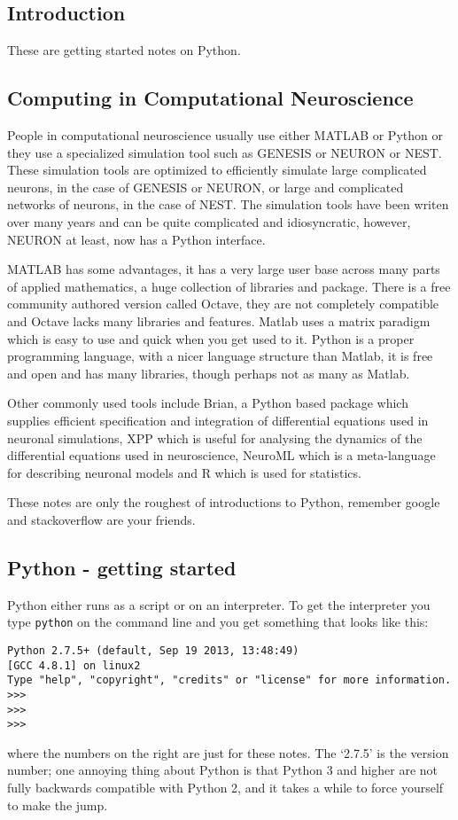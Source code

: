 \documentclass[11pt,a4paper]{scrartcl}
\begin{document}
\subsection*{Introduction}
These are getting started notes on Python.
\subsection*{Computing in Computational Neuroscience}
People in computational neuroscience usually use either MATLAB or
Python or they use a specialized simulation tool such as GENESIS or
NEURON or NEST. These simulation tools are optimized to efficiently
simulate large complicated neurons, in the case of GENESIS or NEURON,
or large and complicated networks of neurons, in the case of NEST. The
simulation tools have been writen over many years and can be quite
complicated and idiosyncratic, however, NEURON at least, now has a
Python interface. 

MATLAB has some advantages, it has a very large user base across many
parts of applied mathematics, a huge collection of libraries and
package. There is a free community authored version called Octave,
they are not completely compatible and Octave lacks many libraries and
features. Matlab uses a matrix paradigm which is easy to use and quick
when you get used to it. Python is a proper programming language, with
a nicer language structure than Matlab, it is free and open and has
many libraries, though perhaps not as many as Matlab.

Other commonly used tools include Brian, a Python based package which
supplies efficient specification and integration of differential
equations used in neuronal simulations, XPP which is useful for
analysing the dynamics of the differential equations used in
neuroscience, NeuroML which is a meta-language for describing neuronal
models and R which is used for statistics.

These notes are only the roughest of introductions to Python, remember
google and stackoverflow are your friends.

\subsection*{Python - getting started}
Python either runs as a script or on an interpreter. To get the
interpreter you type \texttt{python} on the command line and you get
something that looks like this:
\begin{lstlisting}[numbers=right]
Python 2.7.5+ (default, Sep 19 2013, 13:48:49) 
[GCC 4.8.1] on linux2
Type "help", "copyright", "credits" or "license" for more information.
>>> 
>>> 
>>> 
\end{lstlisting}
where the numbers on the right are just for these notes. The
\lq{}2.7.5\rq{} is the version number; one annoying thing about Python
is that Python 3 and higher are not fully backwards compatible with
Python 2, and it takes a while to force yourself to make the jump.
\end{document}
